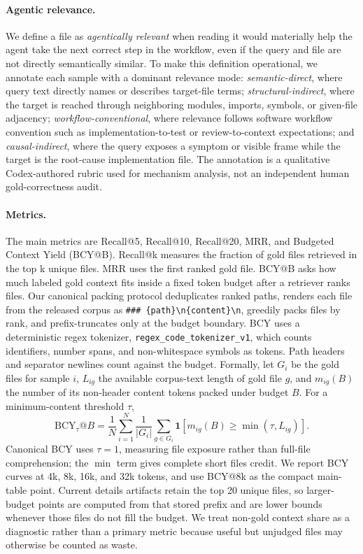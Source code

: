 \documentclass[11pt]{article}
\newcommand{\code}[1]{\texttt{#1}}
\begin{document}
\paragraph{Agentic relevance.}
We define a file as \emph{agentically relevant} when reading it would materially help the agent take the next correct step in the workflow, even if the query and file are not directly semantically similar. To make this definition operational, we annotate each sample with a dominant relevance mode: \emph{semantic-direct}, where query text directly names or describes target-file terms; \emph{structural-indirect}, where the target is reached through neighboring modules, imports, symbols, or given-file adjacency; \emph{workflow-conventional}, where relevance follows software workflow convention such as implementation-to-test or review-to-context expectations; and \emph{causal-indirect}, where the query exposes a symptom or visible frame while the target is the root-cause implementation file. The annotation is a qualitative Codex-authored rubric used for mechanism analysis, not an independent human gold-correctness audit.

\paragraph{Metrics.}
The main metrics are Recall@5, Recall@10, Recall@20, MRR, and Budgeted Context Yield (BCY@B). Recall@k measures the fraction of gold files retrieved in the top k unique files. MRR uses the first ranked gold file. BCY@B asks how much labeled gold context fits inside a fixed token budget after a retriever ranks files. Our canonical packing protocol deduplicates ranked paths, renders each file from the released corpus as \code{\#\#\# \{path\}\textbackslash n\{content\}\textbackslash n}, greedily packs files by rank, and prefix-truncates only at the budget boundary. BCY uses a deterministic regex tokenizer, \code{regex\_code\_tokenizer\_v1}, which counts identifiers, number spans, and non-whitespace symbols as tokens. Path headers and separator newlines count against the budget. Formally, let \(G_i\) be the gold files for sample \(i\), \(L_{ig}\) the available corpus-text length of gold file \(g\), and \(m_{ig}(B)\) the number of its non-header content tokens packed under budget \(B\). For a minimum-content threshold \(\tau\),
\[
\mathrm{BCY}_{\tau}@B=\frac{1}{N}\sum_{i=1}^{N}\frac{1}{|G_i|}\sum_{g\in G_i}\mathbf{1}\!\left[m_{ig}(B)\geq\min(\tau,L_{ig})\right].
\]
Canonical BCY uses \(\tau=1\), measuring file exposure rather than full-file comprehension; the \(\min\) term gives complete short files credit. We report BCY curves at 4k, 8k, 16k, and 32k tokens, and use BCY@8k as the compact main-table point. Current details artifacts retain the top 20 unique files, so larger-budget points are computed from that stored prefix and are lower bounds whenever those files do not fill the budget. We treat non-gold context share as a diagnostic rather than a primary metric because useful but unjudged files may otherwise be counted as waste.
\end{document}

